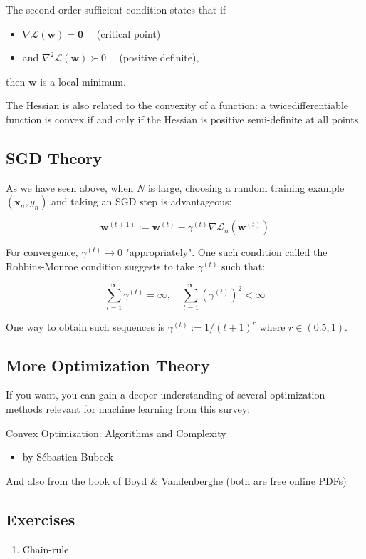 The second-order sufficient condition states that if

\begin{itemize}
  \item $\nabla \mathcal{L}(\mathbf{w})=\mathbf{0} \quad$ (critical point)
  \item and $\nabla^{2} \mathcal{L}(\mathbf{w}) \succ 0 \quad$ (positive definite),
\end{itemize}

then $\mathbf{w}$ is a local minimum.

The Hessian is also related to the convexity of a function: a twicedifferentiable function is convex if and only if the Hessian is positive semi-definite at all points.

\subsection*{SGD Theory}
As we have seen above, when $N$ is large, choosing a random training example $\left(\mathbf{x}_{n}, y_{n}\right)$ and taking an SGD step is advantageous:

$$
\mathbf{w}^{(t+1)}:=\mathbf{w}^{(t)}-\gamma^{(t)} \nabla \mathcal{L}_{n}\left(\mathbf{w}^{(t)}\right)
$$

For convergence, $\gamma^{(t)} \rightarrow 0$ "appropriately". One such condition called the Robbins-Monroe condition suggests to take $\gamma^{(t)}$ such that:

$$
\sum_{t=1}^{\infty} \gamma^{(t)}=\infty, \quad \sum_{t=1}^{\infty}\left(\gamma^{(t)}\right)^{2}<\infty
$$

One way to obtain such sequences is $\gamma^{(t)}:=1 /(t+1)^{r}$ where $r \in(0.5,1)$.

\subsection*{More Optimization Theory}
If you want, you can gain a deeper understanding of several optimization methods relevant for machine learning from this survey:

Convex Optimization: Algorithms and Complexity

\begin{itemize}
  \item by Sébastien Bubeck
\end{itemize}

And also from the book of Boyd \& Vandenberghe (both are free online PDFs)


\subsection*{Exercises}
\begin{enumerate}
  \item Chain-rule
\end{enumerate}



